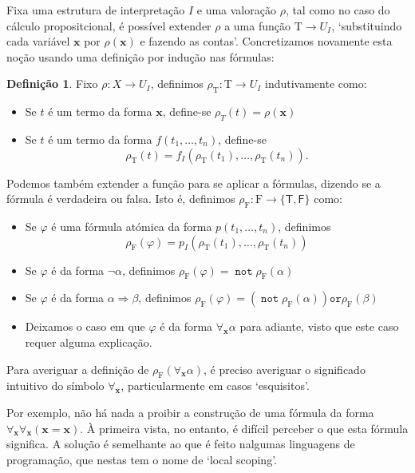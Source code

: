 \documentclass{report}
\theoremstyle{definition}
\newtheorem{definicao}{Definição}
\theoremstyle{remark}
\renewcommand{\bf}[1]{\mathbf{#1}}
\newcommand{\F}{\mathrm{F}}
\newcommand{\T}{\mathrm{T}}
\newcommand{\lt}{\mathsf{T}}
\newcommand{\lf}{\mathsf{F}}
\DeclareMathOperator{\pnot}{\texttt{not}}
\newcommand{\por}{\mathbin{\texttt{or}}}
\newcommand{\imply}{\mathbin{\Rightarrow}}
\begin{document}
	Fixa uma estrutura de interpretação $I$ e uma valoração $\rho$, tal como no caso do cálculo propositcional, é possível extender $\rho$ a uma função $\T \to U_I$, `substituindo cada variável $\bf x$ por $\rho(\bf x)$ e fazendo as contas'. Concretizamos novamente esta noção usando uma definição por indução nas fórmulas:
	
	\begin{definicao}
	Fixo $\rho : X \to U_I$, definimos $\rho_\T : \T \to U_I$ indutivamente como:
	
	\begin{itemize}
	\item Se $t$ é um termo da forma $\bf x$, define-se $\rho_T(t) = \rho(\bf x)$
	
	\item Se $t$ é um termo da forma $f(t_1, \dots, t_n)$, define-se
	\[\rho_\T(t) = f_I(\rho_\T(t_1), \dots, \rho_\T(t_n)).\]
	\end{itemize}
	
	Podemos também extender a função para se aplicar a fórmulas, dizendo se a fórmula é verdadeira ou falsa. Isto é, definimos $\rho_\F : \F \to \{\lt, \lf\}$ como:
	
	\begin{itemize}
	\item Se $\varphi$ é uma fórmula atómica da forma $p(t_1, \dots, t_n)$, definimos
	\[\rho_\F(\varphi) = p_I(\rho_\T(t_1), \dots, \rho_\T(t_n))\]
	
	\item Se $\varphi$ é da forma $\neg \alpha$, definimos $\rho_\F(\varphi) = \pnot \rho_\F(\alpha)$
	
	\item Se $\varphi$ é da forma $\alpha \imply \beta$, definimos $\rho_\F(\varphi) = (\pnot \rho_\F(\alpha)) \por \rho_\F(\beta)$
	
	\item Deixamos o caso em que $\varphi$ é da forma $\forall_{\bf x} \alpha$ para adiante, visto que este caso requer alguma explicação.
	\end{itemize}
	\end{definicao}
	
	Para averiguar a definição de $\rho_\F(\forall_{\bf x} \alpha)$, é preciso averiguar o significado intuitivo do símbolo $\forall_{\bf x}$, particularmente em casos `esquisitos'.
	
	Por exemplo, não há nada a proibir a construção de uma fórmula da forma $\forall_{\bf x} \forall_{\bf x} (\bf x = \bf x)$. À primeira vista, no entanto, é difícil perceber o que esta fórmula significa. A solução é semelhante ao que é feito nalgumas linguagens de programação, que nestas tem o nome de `local scoping'.
	
\end{document}
